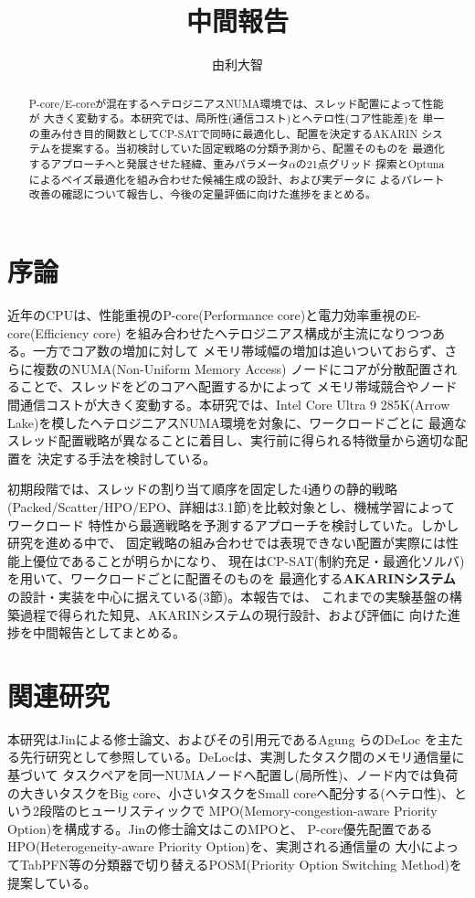 \documentclass[a4paper]{article}
\title{中間報告}
\author{
    由利大智
}
\date{}
\begin{document}
\maketitle

\begin{abstract}
P-core/E-coreが混在するヘテロジニアスNUMA環境では、スレッド配置によって性能が
大きく変動する。本研究では、局所性(通信コスト)とヘテロ性(コア性能差)を
単一の重み付き目的関数としてCP-SATで同時に最適化し、配置を決定するAKARIN
システムを提案する。当初検討していた固定戦略の分類予測から、配置そのものを
最適化するアプローチへと発展させた経緯、重みパラメータ$\alpha$の21点グリッド
探索とOptunaによるベイズ最適化を組み合わせた候補生成の設計、および実データに
よるパレート改善の確認について報告し、今後の定量評価に向けた進捗をまとめる。
\end{abstract}

\section{序論}
近年のCPUは、性能重視のP-core(Performance core)と電力効率重視のE-core(Efficiency core)
を組み合わせたヘテロジニアス構成が主流になりつつある。一方でコア数の増加に対して
メモリ帯域幅の増加は追いついておらず、さらに複数のNUMA(Non-Uniform Memory Access)
ノードにコアが分散配置されることで、スレッドをどのコアへ配置するかによって
メモリ帯域競合やノード間通信コストが大きく変動する。本研究では、Intel Core Ultra 9
285K(Arrow Lake)を模したヘテロジニアスNUMA環境を対象に、ワークロードごとに
最適なスレッド配置戦略が異なることに着目し、実行前に得られる特徴量から適切な配置を
決定する手法を検討している。

初期段階では、スレッドの割り当て順序を固定した4通りの静的戦略
(Packed/Scatter/HPO/EPO、詳細は3.1節)を比較対象とし、機械学習によってワークロード
特性から最適戦略を予測するアプローチを検討していた。しかし研究を進める中で、
固定戦略の組み合わせでは表現できない配置が実際には性能上優位であることが明らかになり、
現在はCP-SAT(制約充足・最適化ソルバ)を用いて、ワークロードごとに配置そのものを
最適化する\textbf{AKARINシステム}の設計・実装を中心に据えている(3節)。本報告では、
これまでの実験基盤の構築過程で得られた知見、AKARINシステムの現行設計、および評価に
向けた進捗を中間報告としてまとめる。

\section{関連研究}
本研究はJinによる修士論文\cite{jin}、およびその引用元であるAgung らのDeLoc\cite{deloc}
を主たる先行研究として参照している。DeLocは、実測したタスク間のメモリ通信量に基づいて
タスクペアを同一NUMAノードへ配置し(局所性)、ノード内では負荷の大きいタスクをBig
core、小さいタスクをSmall coreへ配分する(ヘテロ性)、という2段階のヒューリスティックで
MPO(Memory-congestion-aware Priority Option)を構成する。Jinの修士論文はこのMPOと、
P-core優先配置であるHPO(Heterogeneity-aware Priority Option)を、実測される通信量の
大小によってTabPFN等の分類器で切り替えるPOSM(Priority Option Switching Method)を
提案している。
\end{document}
